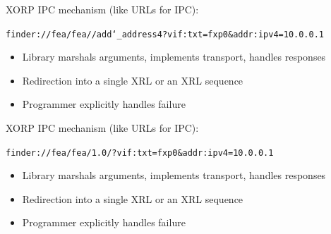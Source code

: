 \documentclass[landscape]{icsislides}
\begin{document}
\begin{slide}

XORP IPC mechanism (like URLs for IPC):

\begin{center}
\texttt{finder://fea/fea//add\char`\_address4?vif:txt=fxp0\&addr:ipv4=10.0.0.1}
\vskip20pt
\end{center}

\begin{itemize}
  \item Library marshals arguments, implements transport, handles responses
  \item Redirection into a single XRL or an XRL sequence
  \item Programmer explicitly handles failure
\end{itemize}

\end{slide}

\begin{slide}

XORP IPC mechanism (like URLs for IPC):

\begin{center}
\texttt{finder://fea/fea/1.0/?vif:txt=fxp0\&addr:ipv4=10.0.0.1}
\vskip20pt
\end{center}

\begin{itemize}
  \item Library marshals arguments, implements transport, handles responses
  \item Redirection into a single XRL or an XRL sequence
  \item Programmer explicitly handles failure
\end{itemize}

\end{slide}
\end{document}
